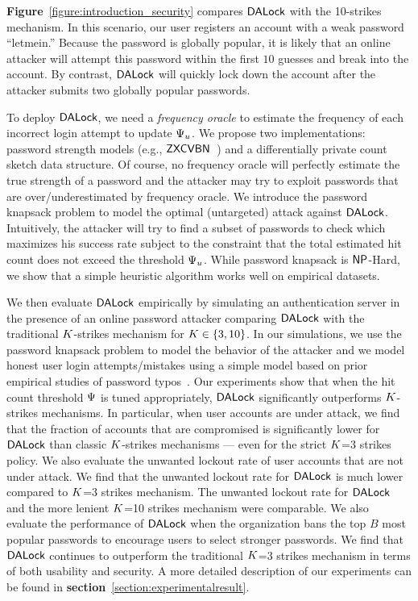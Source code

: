  \textbf{Figure}~\ref{figure:introduction_security} compares $\mathsf{DALock}$ with the 10-strikes mechanism. In this scenario, our user registers an account with a weak password ``letmein.'' Because the password is globally popular, it is likely that an online attacker will attempt this password within the first $10$ guesses and break into the account. By contrast, $\mathsf{DALock}$ will quickly lock down the account after the attacker submits two globally popular passwords. 


To deploy $\mathsf{DALock}$, we need a \textit{frequency oracle} to estimate the frequency of each incorrect login attempt to update $\Psi_{u}$. We propose two implementations: password strength models (e.g., $\mathsf{ZXCVBN}$~\cite{USENIX:Wheeler16}) and a differentially private count sketch data structure. Of course, no frequency oracle will perfectly estimate the true strength of a password and the attacker may try to exploit passwords that are over/underestimated by frequency oracle. We introduce the password knapsack problem to model the optimal (untargeted) attack against $\mathsf{DALock}$. Intuitively, the attacker will try to find a subset of passwords to check which maximizes his success rate subject to the constraint that the total estimated hit count does not exceed the threshold $\Psi_{u}$.  While password knapsack is $\mathsf{NP}$-Hard, we show that a simple heuristic algorithm works well on empirical datasets. 


We then evaluate $\mathsf{DALock}$ empirically by simulating an authentication server in the presence of an online password attacker comparing $\mathsf{DALock}$ with the traditional $K$-strikes mechanism for $K \in \{3,10\}$. In our simulations, we use the password knapsack problem to model the behavior of the attacker and we model honest user login attempts/mistakes using a simple model based on prior empirical studies of password typos~\cite{CCS:CWPCR17,SP:CAAJR16}. Our experiments show that when the hit count threshold $\Psi$ is tuned appropriately, $\mathsf{DALock}$ significantly outperforms $K$-strikes mechanisms. In particular, when user accounts are under attack, we find that the fraction of accounts that are compromised is significantly lower for $\mathsf{DALock}$ than classic $K$-strikes mechanisms --- even for the strict $K$=3 strikes policy. We also evaluate the unwanted lockout rate of user accounts that are not under attack. We find that the unwanted lockout rate for $\mathsf{DALock}$ is much lower compared to $K$=3 strikes mechanism. The unwanted lockout rate for $\mathsf{DALock}$ and the more lenient $K$=10 strikes mechanism were comparable. We also evaluate the performance of $\mathsf{DALock}$ when the organization bans the top $B$ most popular passwords to encourage users to select stronger passwords. We find that $\mathsf{DALock}$ continues to outperform the traditional $K$=3 strikes mechanism in terms of both usability and security. A more detailed description of our experiments can be found in \textbf{section}~\ref{section:experimentalresult}.

